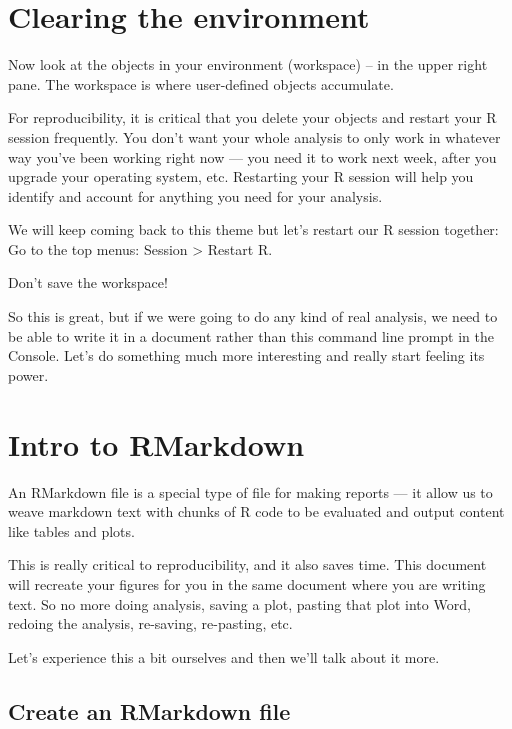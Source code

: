 \documentclass[]{book}
\begin{document}
\hypertarget{clearing-the-environment}{%
\section{Clearing the environment}\label{clearing-the-environment}}

Now look at the objects in your environment (workspace) -- in the upper right pane. The workspace is where user-defined objects accumulate.

For reproducibility, it is critical that you delete your objects and restart your R session frequently. You don't want your whole analysis to only work in whatever way you've been working right now --- you need it to work next week, after you upgrade your operating system, etc. Restarting your R session will help you identify and account for anything you need for your analysis.

We will keep coming back to this theme but let's restart our R session together: Go to the top menus: Session \textgreater{} Restart R.

Don't save the workspace!

So this is great, but if we were going to do any kind of real analysis, we need to be able to write it in a document rather than this command line prompt in the Console. Let's do something much more interesting and really start feeling its power.

\hypertarget{intro-to-rmarkdown}{%
\section{Intro to RMarkdown}\label{intro-to-rmarkdown}}

An RMarkdown file is a special type of file for making reports --- it allow us to weave markdown text with chunks of R code to be evaluated and output content like tables and plots.

This is really critical to reproducibility, and it also saves time. This document will recreate your figures for you in the same document where you are writing text. So no more doing analysis, saving a plot, pasting that plot into Word, redoing the analysis, re-saving, re-pasting, etc.

Let's experience this a bit ourselves and then we'll talk about it more.

\hypertarget{create-an-rmarkdown-file}{%
\subsection{Create an RMarkdown file}\label{create-an-rmarkdown-file}}
\end{document}
